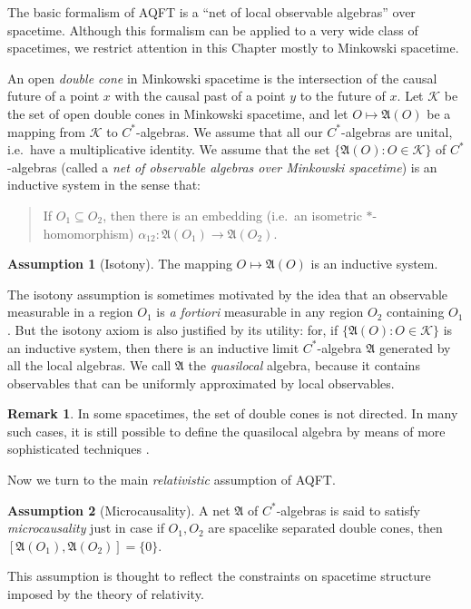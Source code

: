 \documentclass[12pt]{article}
\newcommand{\alg}[1]{\mathfrak{#1}}
\theoremstyle{definition}
\newtheorem{assumption}{Assumption}
\theoremstyle{definition}
\newtheorem{note}[thm]{Remark}
\theoremstyle{remark}
\def\2#1{{\mathcal #1}}
\def\al#1{{\mathfrak #1}}
\def\a{\alpha} \def\b{\beta} \def\g{\gamma} \def\d{\delta}
\begin{document}
The basic formalism of AQFT is a ``net of local observable algebras''
over spacetime.  Although this formalism can be applied to a very wide
class of spacetimes, we restrict attention in this Chapter mostly to
Minkowski spacetime.

An open \emph{double cone} in Minkowski spacetime is the intersection
of the causal future of a point $x$ with the causal past of a point
$y$ to the future of $x$.  Let $\2K$ be the set of open double cones
in Minkowski spacetime, and let $O\mapsto \alg{A}(O)$ be a mapping
from $\2K$ to $C^*$-algebras.  We assume that all our $C^*$-algebras
are unital, i.e.\ have a multiplicative identity.  We assume that the
set $\{ \alg{A}(O):O\in \2K \}$ of $C^*$-algebras (called a \emph{net
  of observable algebras over Minkowski spacetime}) is an inductive
system in the sense that:

\begin{quote} If $O_1\subseteq O_2$, then there is an embedding (i.e.\
  an isometric $*$-homomorphism) ${\a _{12}:\alg{A}(O_1)\to
  \alg{A}(O_2)}$.  \end{quote}

\begin{assumption}[Isotony] The mapping $O\mapsto \al A (O)$ is an
  inductive system.  \end{assumption}

The isotony assumption is sometimes motivated by the idea that an
observable measurable in a region $O_1$ is \emph{a fortiori}
measurable in any region $O_2$ containing $O_1$.  But the isotony
axiom is also justified by its utility: for, if $\{ \alg{A}(O):O\in
\2K \}$ is an inductive system, then there is an inductive limit
$C^{*}$-algebra $\alg{A}$ generated by all the local algebras.  We
call $\alg{A}$ the \emph{quasilocal} algebra, because it contains
observables that can be uniformly approximated by local observables.

\begin{note} In some spacetimes, the set of double cones is not
  directed.  In many such cases, it is still possible to define the
  quasilocal algebra by means of more sophisticated techniques
  \cite{glob}.
\end{note}

Now we turn to the main \emph{relativistic} assumption of AQFT.
\begin{assumption}[Microcausality] A net $\alg{A}$ of $C^*$-algebras
  is said to satisfy \emph{microcausality} just in case if $O_1,O_2$
  are spacelike separated double cones, then
  $[\alg{A}(O_1),\alg{A}(O_2)]=\{ 0\}$.
  \label{micro}
\end{assumption}
This assumption is thought to reflect the constraints on spacetime structure imposed
by the theory of relativity.  
\end{document}
